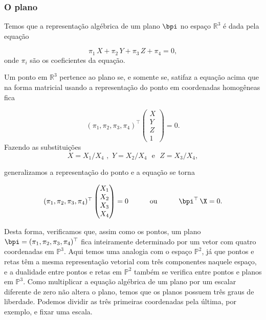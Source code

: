  

\subsubsection{O plano}

Temos que a representação algébrica de um plano $\bpi$ no espaço $\mathbb{R}^3$ é dada pela equação

\begin{equation*}
\pi_1\,X+\pi_2\,Y+\pi_3\,Z+\pi_4=0,
\end{equation*}
onde $\pi_i$ são os coeficientes da equação.

Um ponto em $\mathbb{R}^3$ pertence ao plano se, e somente se, satifaz a equação acima que na forma matricial usando a representação do ponto em coordenadas homogêneas fica

\begin{equation*}
  (\pi_1,\pi_2,\pi_3,\pi_4)^\top
 \begin{pmatrix}
  X\\
  Y\\
  Z\\
  1
  \end{pmatrix}
 = 0.
\end{equation*}
Fazendo as substituições 
\begin{equation*}
X=X_1/X_4 \,\, , \,\, Y=X_2/X_4 \,\,\,\, \text{e} \,\,\,\, Z=X_3/X_4 ,
\end{equation*}

generalizamos a representação do ponto e a equação se torna

\begin{equation*}
\begin{array}{ccc}
(\pi_1,\pi_2,\pi_3,\pi_4)^\top
  \begin{pmatrix}
  X_1\\
  X_2\\
  X_3\\
  X_4
  \end{pmatrix}
  = 0
& \qquad \text{ou} \qquad
& \bpi^\top \, \X = 0.
\end{array}
\end{equation*}

Desta forma, verificamos que, assim como os pontos, um plano $\bpi = (\pi_1,\pi_2,\pi_3,\pi_4)^\top$ fica inteiramente determinado por um vetor com quatro coordenadas em $\mathbb{P}^3$. Aqui temos uma analogia com o espaço $\mathbb{P}^2$, já que pontos e retas têm a mesma representação vetorial com três componentes naquele espaço, e a dualidade entre pontos e retas em $\mathbb{P}^2$ também se verifica entre pontos e planos em $\mathbb{P}^3$. Como multiplicar a equação algébrica de um plano por um escalar diferente de zero não altera o plano, temos que os planos possuem três graus de liberdade. Podemos dividir as três primeiras coordenadas pela última, por exemplo, e fixar uma escala.

